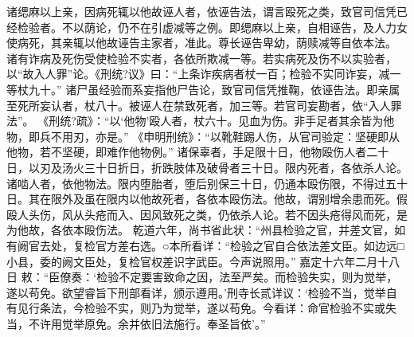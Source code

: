 \documentclass[12pt,UTF8]{ctexbook}
\begin{document}
诸缌麻以上亲，因病死辄以他故诬人者，依诬告法，谓言殴死之类，致官司信凭已经检验者。不以荫论，仍不在引虚减等之例。即缌麻以上亲，自相诬告，及人力女使病死，其亲辄以他故诬告主家者，准此。尊长诬告卑幼，荫赎减等自依本法。
诸有诈病及死伤受使检验不实者，各依所欺减一等。若实病死及伤不以实验者，以“故入人罪”论。《刑统?议》曰：“上条诈疾病者杖一百；检验不实同诈妄，减一等杖九十。”
诸尸虽经验而系妄指他尸告论，致官司信凭推鞠，依诬告法。即亲属至死所妄认者，杖八十。被诬人在禁致死者，加三等。若官司妄勘者，依“入人罪法”。
《刑统?疏》：“以‘他物’殴人者，杖六十。见血为伤。非手足者其余皆为他物，即兵不用刃，亦是。”
《申明刑统》：“以靴鞋踢人伤，从官司验定：坚硬即从他物，若不坚硬，即难作他物例。”
诸保辜者，手足限十日，他物殴伤人者二十日，以刃及汤火三十日折日，折跌肢体及破骨者三十日。限内死者，各依杀人论。诸啮人者，依他物法。限内堕胎者，堕后别保三十日，仍通本殴伤限，不得过五十日。其在限外及虽在限内以他故死者，各依本殴伤法。他故，谓别增余患而死。假殴人头伤，风从头疮而入、因风致死之类，仍依杀人论。若不因头疮得风而死，是为他故，各依本殴伤法。
乾道六年，尚书省此状：“州县检验之官，并差文官，如有阙官去处，复检官方差右选。○本所看详：“检验之官自合依法差文臣。如边远□小县，委的阙文臣处，复检官权差识字武臣。今声说照用。”
嘉定十六年二月十八日
敕：“臣僚奏：‘检验不定要害致命之因，法至严矣。而检验失实，则为觉举，遂以苟免。欲望睿旨下刑部看详，颁示遵用。’刑寺长贰详议：‘检验不当，觉举自有见行条法，今检验不实，则乃为觉举，遂以苟免。今看详：命官检验不实或失当，不许用觉举原免。余并依旧法施行。奉圣旨依’。”
\end{document}
